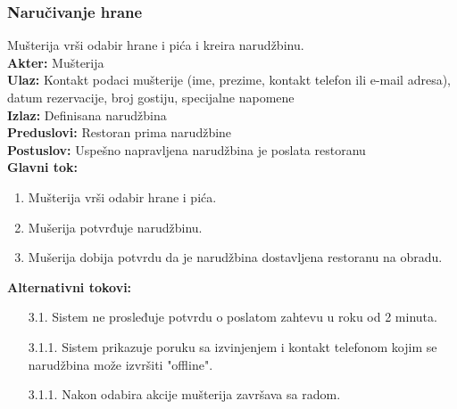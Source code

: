 \documentclass{article}
\begin{document}
\subsubsection{Naručivanje hrane}
Mušterija vrši odabir hrane i pića i kreira narudžbinu.\\
\textbf{Akter:} Mušterija\\
\textbf{Ulaz:} Kontakt podaci mušterije (ime, prezime, kontakt telefon ili e-mail adresa), datum rezervacije, broj gostiju, specijalne napomene\\
\textbf{Izlaz:} Definisana narudžbina\\
\textbf{Preduslovi:} Restoran prima narudžbine\\
\textbf{Postuslov:} Uspešno napravljena narudžbina je poslata restoranu\\
\textbf{Glavni tok:}
\begin{enumerate}
\item Mušterija vrši odabir hrane i pića.
\item Mušerija potvrđuje narudžbinu.
\item Mušerija dobija potvrdu da je narudžbina dostavljena restoranu na obradu.\\
\end{enumerate}
\textbf{Alternativni tokovi:} \\
\begin{itemize}
\item [3.1.] Sistem ne prosleđuje potvrdu o poslatom zahtevu u roku od 2 minuta.
\item [3.1.1.] Sistem prikazuje poruku sa izvinjenjem i kontakt telefonom kojim se narudžbina može izvršiti "offline".
\item [3.1.1.] Nakon odabira akcije mušterija završava sa radom.
\end{itemize}
\end{document}
